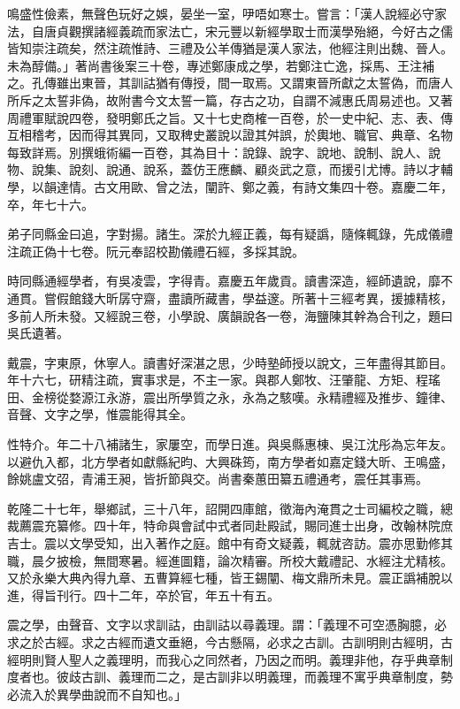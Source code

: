 \begin{pinyinscope}
鳴盛性儉素，無聲色玩好之娛，晏坐一室，吚唔如寒士。嘗言：「漢人說經必守家法，自唐貞觀撰諸經義疏而家法亡，宋元豐以新經學取士而漢學殆絕，今好古之儒皆知崇注疏矣，然注疏惟詩、三禮及公羊傳猶是漢人家法，他經注則出魏、晉人。未為醇備。」著尚書後案三十卷，專述鄭康成之學，若鄭注亡逸，採馬、王注補之。孔傳雖出東晉，其訓詁猶有傳授，間一取焉。又謂東晉所獻之太誓偽，而唐人所斥之太誓非偽，故附書今文太誓一篇，存古之功，自謂不減惠氏周易述也。又著周禮軍賦說四卷，發明鄭氏之旨。又十七史商榷一百卷，於一史中紀、志、表、傳互相稽考，因而得其異同，又取稗史叢說以證其舛誤，於輿地、職官、典章、名物每致詳焉。別撰蛾術編一百卷，其為目十：說錄、說字、說地、說制、說人、說物、說集、說刻、說通、說系，蓋仿王應麟、顧炎武之意，而援引尤博。詩以才輔學，以韻達情。古文用歐、曾之法，闡許、鄭之義，有詩文集四十卷。嘉慶二年，卒，年七十六。

弟子同縣金曰追，字對揚。諸生。深於九經正義，每有疑譌，隨條輒錄，先成儀禮注疏正偽十七卷。阮元奉詔校勘儀禮石經，多採其說。

時同縣通經學者，有吳凌雲，字得青。嘉慶五年歲貢。讀書深造，經師遺說，靡不通貫。嘗假館錢大昕孱守齋，盡讀所藏書，學益邃。所著十三經考異，援據精核，多前人所未發。又經說三卷，小學說、廣韻說各一卷，海鹽陳其幹為合刊之，題曰吳氏遺著。

戴震，字東原，休寧人。讀書好深湛之思，少時塾師授以說文，三年盡得其節目。年十六七，研精注疏，實事求是，不主一家。與郡人鄭牧、汪肇龍、方矩、程瑤田、金榜從婺源江永游，震出所學質之永，永為之駭嘆。永精禮經及推步、鐘律、音聲、文字之學，惟震能得其全。

性特介。年二十八補諸生，家屢空，而學日進。與吳縣惠棟、吳江沈彤為忘年友。以避仇入都，北方學者如獻縣紀昀、大興硃筠，南方學者如嘉定錢大昕、王鳴盛，餘姚盧文弨，青浦王昶，皆折節與交。尚書秦蕙田纂五禮通考，震任其事焉。

乾隆二十七年，舉鄉試，三十八年，詔開四庫館，徵海內淹貫之士司編校之職，總裁薦震充纂修。四十年，特命與會試中式者同赴殿試，賜同進士出身，改翰林院庶吉士。震以文學受知，出入著作之庭。館中有奇文疑義，輒就咨訪。震亦思勤修其職，晨夕披檢，無間寒暑。經進圖籍，論次精審。所校大戴禮記、水經注尤精核。又於永樂大典內得九章、五曹算經七種，皆王錫闡、梅文鼎所未見。震正譌補脫以進，得旨刊行。四十二年，卒於官，年五十有五。

震之學，由聲音、文字以求訓詁，由訓詁以尋義理。謂：「義理不可空憑胸臆，必求之於古經。求之古經而遺文垂絕，今古懸隔，必求之古訓。古訓明則古經明，古經明則賢人聖人之義理明，而我心之同然者，乃因之而明。義理非他，存乎典章制度者也。彼歧古訓、義理而二之，是古訓非以明義理，而義理不寓乎典章制度，勢必流入於異學曲說而不自知也。」


\end{pinyinscope}
